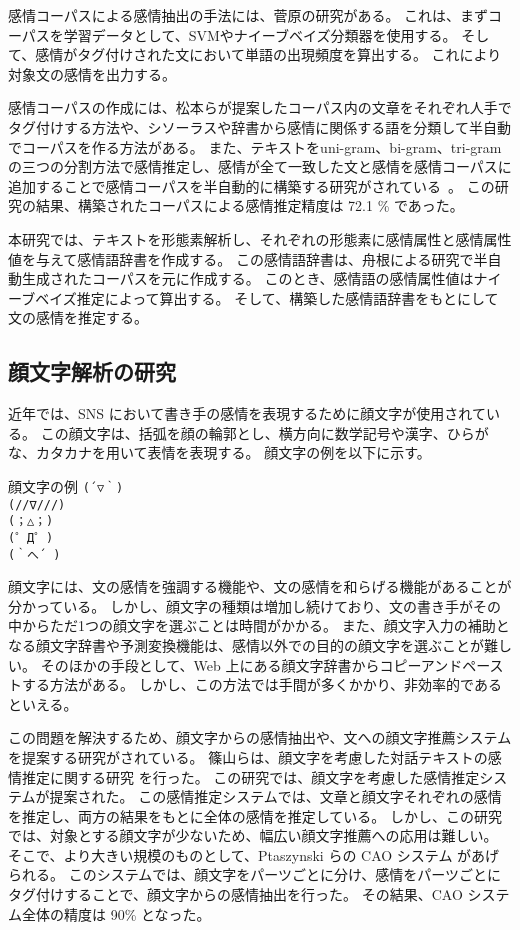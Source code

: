 \documentclass[11pt,a4j]{jsarticle}
\begin{document}
感情コーパスによる感情抽出の手法には、菅原の研究がある。
これは、まずコーパスを学習データとして、SVMやナイーブベイズ分類器を使用する。
そして、感情がタグ付けされた文において単語の出現頻度を算出する。
これにより対象文の感情を出力する。

感情コーパスの作成には、松本らが提案したコーパス内の文章をそれぞれ人手でタグ付けする方法や、シソーラスや辞書から感情に関係する語を分類して半自動でコーパスを作る方法がある。
また、テキストをuni-gram、bi-gram、tri-gram の三つの分割方法で感情推定し、感情が全て一致した文と感情を感情コーパスに追加することで感情コーパスを半自動的に構築する研究がされている~。
この研究の結果、構築されたコーパスによる感情推定精度は 72.1 \% であった。

本研究では、テキストを形態素解析し、それぞれの形態素に感情属性と感情属性値を与えて感情語辞書を作成する。
この感情語辞書は、舟根による研究で半自動生成されたコーパスを元に作成する。
このとき、感情語の感情属性値はナイーブベイズ推定によって算出する。
そして、構築した感情語辞書をもとにして文の感情を推定する。

\subsection{顔文字解析の研究}\label{sec:kaomojichushutsu}
近年では、SNS において書き手の感情を表現するために顔文字が使用されている。
この顔文字は、括弧を顔の輪郭とし、横方向に数学記号や漢字、ひらがな、カタカナを用いて表情を表現する。
顔文字の例を以下に示す。

\begin{itembox}[c]{顔文字の例}
  \verb|(´▽｀)| \\
  \verb|(//∇///)| \\
  \verb|(；△；)| \\
  \verb|(゜Д゜)| \\
  \verb|(｀へ´ )| \\
\end{itembox}

顔文字には、文の感情を強調する機能や、文の感情を和らげる機能があることが分かっている。
しかし、顔文字の種類は増加し続けており、文の書き手がその中からただ1つの顔文字を選ぶことは時間がかかる。
また、顔文字入力の補助となる顔文字辞書や予測変換機能は、感情以外での目的の顔文字を選ぶことが難しい。
そのほかの手段として、Web 上にある顔文字辞書からコピーアンドペーストする方法がある。
しかし、この方法では手間が多くかかり、非効率的であるといえる。

この問題を解決するため、顔文字からの感情抽出や、文への顔文字推薦システムを提案する研究がされている。
篠山らは、顔文字を考慮した対話テキストの感情推定に関する研究  を行った。
この研究では、顔文字を考慮した感情推定システムが提案された。
この感情推定システムでは、文章と顔文字それぞれの感情を推定し、両方の結果をもとに全体の感情を推定している。
しかし、この研究では、対象とする顔文字が少ないため、幅広い顔文字推薦への応用は難しい。
そこで、より大きい規模のものとして、Ptaszynski らの CAO システム があげられる。
このシステムでは、顔文字をパーツごとに分け、感情をパーツごとにタグ付けすることで、顔文字からの感情抽出を行った。
その結果、CAO システム全体の精度は 90\% となった。
\end{document}
